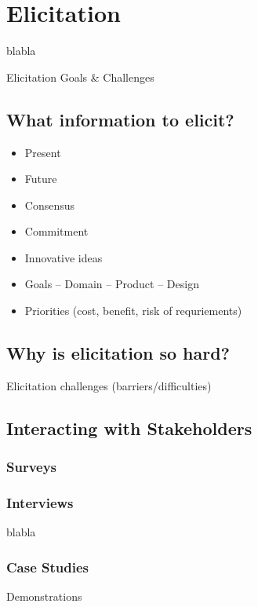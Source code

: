 
\chapter{Elicitation}%
blabla


Elicitation Goals \& Challenges%

\section{What information to elicit?}

\begin{itemize}
  \item Present
  \item Future 
  \item Consensus 
  \item Commitment 
  \item Innovative ideas
  \item Goals -- Domain -- Product -- Design
  \item Priorities (cost, benefit, risk of requriements)
\end{itemize}

\section{Why is elicitation so hard?}

Elicitation challenges (barriers/difficulties) 

\section{Interacting with Stakeholders}%

\subsection{Surveys}

\subsection{Interviews}

blabla

\subsection{Case Studies}

Demonstrations


